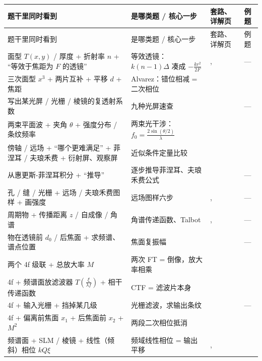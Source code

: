 {\small\renewcommand{\arraystretch}{1.3}
\begin{longtable}{@{}P{5.9cm}P{5.1cm}P{2.9cm}P{2.1cm}@{}}
\toprule
题干里同时看到 & 是哪类题 / 核心一步 & 套路、详解页 & 例题\\ \midrule
\endfirsthead
\toprule
题干里同时看到 & 是哪类题 / 核心一步 & 套路、详解页 & 例题\\ \midrule
\endhead
\bottomrule
\endfoot
{}
面型 $T(x,y)$ / 厚度 + 折射率 $n$ + “等效于焦距为 $F$ 的透镜” & 等效透镜：$k(n-1)\Delta$ 凑成 $-\frac{kr^2}{2F}$ & \pageref{sec:equivlens}, \pageref{sec:screens} & —\\
三次面型 $x^3$ + 两片互补 + 平移 $d$ + 焦距 & Alvarez：错位相减 = 二次相位 & \pageref{sec:alvarezi} & \pageref{ex:v-alvarez}\\
写出某光屏 / 光栅 / 棱镜的复透射系数 & 九种光屏速查 & \pageref{sec:screens} & —\\
两束平面波 + 夹角 $\theta$ + 强度分布 / 条纹频率 & 两束光干涉：$f_0=\frac{2\sin(\theta/2)}{\lambda}$ & \pageref{sec:twobeam} & \pageref{ex:v-sim}\\
傍轴 / 远场 + “哪个更难满足” + 菲涅耳 / 夫琅禾费 + 衍射屏、观察屏 & 近似条件定量比较 & \pageref{box:approx} & \pageref{ex:v-approx}\\
从惠更斯-菲涅耳积分 + “推导” & 逐步推导菲涅耳、夫琅禾费公式 & \pageref{sec:diffderiv} & —\\
孔 / 缝 / 光栅 + 远场 / 夫琅禾费图样 + 画强度 & 远场图样六步 & \pageref{sec:fraunrecipe}, \pageref{sec:ftexamples} & —\\
周期物 + 传播距离 $z$ / 自成像 / 角谱 & 角谱传递函数、Talbot & \pageref{sec:angspec}, \pageref{ex:talbot} & —\\
物在透镜前 $d_0$ / 后焦面 + 求频谱、谱点位置 & 焦面复振幅 & \pageref{sec:focalplane} & —\\
两个 4f 级联 + 总放大率 $M$ & 两次 FT = 倒像，放大率相乘 & \pageref{sec:4fderiv} & \pageref{ex:v-4f2}\\
4f + 频谱面放滤波器 $T(\frac{\xi}{\lambda f})$ + 相干传递函数 & CTF = 滤波片本身 & \pageref{sec:4fctf} & \pageref{ex:v-4f2}\\
4f + 输入光栅 + 挡掉某几级 & 光栅滤波，求输出条纹 & \pageref{sec:gratingfilter} & —\\
4f + 偏离前焦面 $x_1$ + 后焦面前 $x_2$ + $M^2$ & 两段二次相位抵消 & \pageref{sec:4foffset} & \pageref{ex:v-4fshift}\\
频谱面 + SLM / 棱镜 + 线性（倾斜）相位 $kQ\xi$ & 频域线性相位 = 输出平移 & \pageref{sec:linphase}, \pageref{sec:alvarezii} & \pageref{ex:v-alvarez}\\

\end{longtable}}
